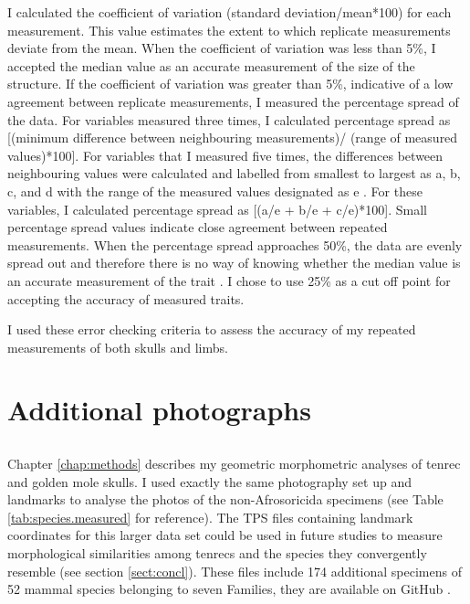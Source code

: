 	I calculated the coefficient of variation (standard deviation/mean*100) for each measurement. This value estimates the extent to which replicate measurements deviate from the mean. When the coefficient of variation was less than 5\%, I accepted the median value as an accurate measurement of the size of the structure. 
	If the coefficient of variation was greater than 5\%, indicative of a low agreement between replicate measurements, I measured the percentage spread of the data. For variables measured three times, I calculated percentage spread as [(minimum difference between neighbouring measurements)/ (range of measured values)*100].
	For variables that I measured five times, the differences between neighbouring values were calculated and labelled from smallest to largest as a, b, c, and d with the range of the measured values designated as e \citep[for a full explanation see][]{Cooper2009}. For these variables, I calculated percentage spread as [(a/e + b/e + c/e)*100]. 
	Small percentage spread values indicate close agreement between repeated measurements. When the percentage spread approaches 50\%, the data are evenly spread out and therefore there is no way of knowing whether the median value is an accurate measurement of the trait \citep{Cooper2009}. I chose to use 25\% as a cut off point for accepting the accuracy of measured traits.

	I used these error checking criteria to assess the accuracy of my repeated measurements of both skulls and limbs. 

\section{Additional photographs}
	\subsection{}
	Chapter \ref{chap:methods} describes my geometric morphometric analyses of tenrec and golden mole skulls. I used exactly the same photography set up and landmarks to analyse the photos of the non-Afrosoricida specimens (see Table \ref{tab:species.measured} for reference). The TPS files containing landmark coordinates for this larger data set could be used in future studies to measure morphological similarities among tenrecs and the species they convergently resemble (see section \ref{sect:concl}). These files include 174 additional specimens of 52 mammal species belonging to seven Families, they are available on GitHub \citep{Finlay2015c}.
		
